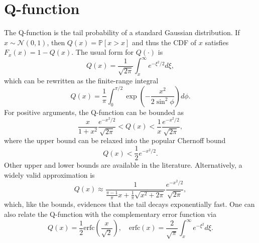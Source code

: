 \documentclass[a4paper, 12pt]{book}
\begin{document}
\section{Q-function}
The Q-function is the tail probability of a standard Gaussian distribution. If $x\sim\mathcal{N}(0,1)$, then $Q(x)=\mathbb{P}[x>x]$ and thus the CDF of $x$ satisfies $F_{x}(x)=1-Q(x)$. The usual form for $Q(\cdot)$ is
\begin{equation}
    Q(x)=\frac{1}{\sqrt{2\pi}}\int_{x}^{\infty}e^{-\xi^{2}/2}d\xi, \tag{E.19}
\end{equation}
which can be rewritten as the finite-range integral
\begin{equation}
    Q(x)=\frac{1}{\pi}\int_{0}^{\pi/2}\exp\left(-\frac{x^{2}}{2\sin^{2}\phi}\right)d\phi. \tag{E.20}
\end{equation}
For positive arguments, the Q-function can be bounded as
\begin{equation}
    \frac{x}{1+x^{2}}\frac{e^{-x^{2}/2}}{\sqrt{2\pi}} < Q(x) < \frac{1}{x}\frac{e^{-x^{2}/2}}{\sqrt{2\pi}}, \tag{E.21}
\end{equation}
where the upper bound can be relaxed into the popular Chernoff bound
\begin{equation}
    Q(x)<\frac{1}{2}e^{-x^{2}/2}. \tag{E.22}
\end{equation}
Other upper and lower bounds are available in the literature. Alternatively, a widely valid approximation is
\begin{equation}
    Q(x)\approx\frac{1}{\frac{\pi-1}{\pi}x+\frac{1}{\pi}\sqrt{x^{2}+2\pi}}\frac{e^{-x^{2}/2}}{\sqrt{2\pi}}, \tag{E.23}
\end{equation}
which, like the bounds, evidences that the tail decays exponentially fast. One can also relate the Q-function with the complementary error function via
\begin{equation}
    Q(x)=\frac{1}{2}\text{erfc}\left(\frac{x}{\sqrt{2}}\right), \quad \text{erfc}(x)=\frac{2}{\sqrt{\pi}}\int_{x}^{\infty}e^{-\xi^{2}}d\xi. \tag{E.24}
\end{equation}
\end{document}

